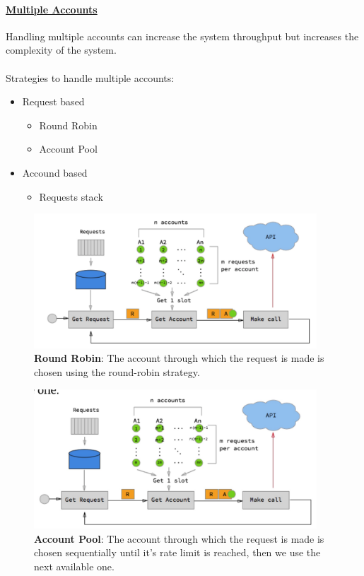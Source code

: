 \documentclass[10pt,a4paper]{article}
\newcommand{\nline}{\\~\\}
\begin{document}
 \paragraph{\uline{Multiple Accounts}} 
 Handling multiple accounts can increase the system throughput but increases the complexity of the system.
\nline
Strategies to handle multiple accounts:
\begin{itemize}
	\item Request based
	\begin{itemize}
		\item Round Robin
		\item Account Pool
	\end{itemize}
	\item Accound based
	\begin{itemize}
		\item Requests stack
	\end{itemize}
\end{itemize}
   \begin{figure}[ht!]
 \hfill \includegraphics[width=300pt]{images/multi-account-rr}
 \hspace*{\fill}
 \caption{\textbf{Round Robin}: The account through which the request is made is chosen using the round-robin strategy.}
 \end{figure}
    \begin{figure}[ht!]
 \hfill \includegraphics[width=300pt]{images/multi-account-pool}
 \hspace*{\fill}
 \caption{\textbf{Account Pool}: The account through which the request is made is chosen sequentially until it’s rate limit is reached, then we use the next available one.}
 \end{figure}
\end{document}
